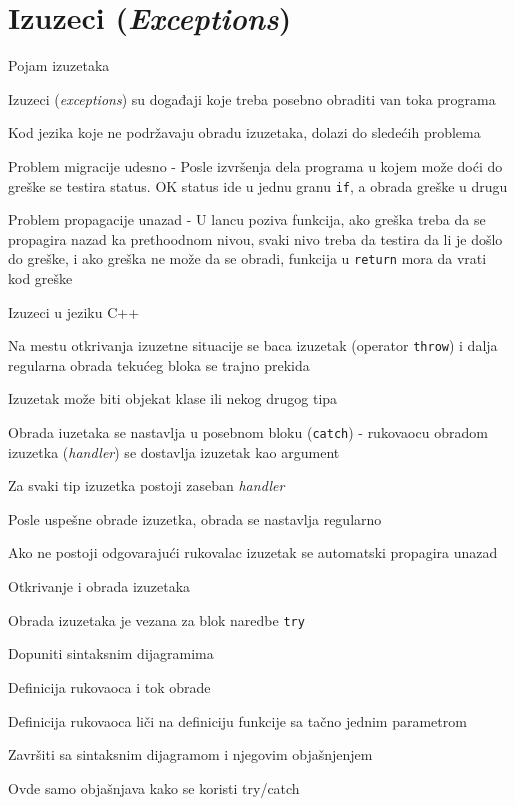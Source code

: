 \documentclass{article}
\newenvironment{xitemize}{%
    
    \itemize
    \larger
}{%
    \enditemize
}
\let\olditemize\itemize
\let\endolditemize\enditemize
\renewenvironment{itemize}{%
    \smaller
    \olditemize
}{%
    \endolditemize
}
\providecommand{\inlinecode}[1]{\texttt{#1}}
\begin{document}
\section{ Izuzeci (\textit{Exceptions})}
\begin{xitemize}
\item Pojam izuzetaka
\begin{itemize}
    \item Izuzeci (\textit{exceptions}) su događaji koje treba posebno obraditi van toka programa
    \item Kod jezika koje ne podržavaju obradu izuzetaka, dolazi do sledećih problema
    \begin{itemize}
        \item[\textperiodcentered] Problem migracije udesno - Posle izvršenja dela programa u kojem može doći do greške se testira status. OK status ide u jednu granu \inlinecode{if}, a obrada greške u drugu
        \item[\textperiodcentered] Problem propagacije unazad - U lancu poziva funkcija, ako greška treba da se propagira nazad ka prethoodnom nivou, svaki nivo treba da testira da li je došlo do greške, i ako greška ne može da se obradi, funkcija u \inlinecode{return} mora da vrati kod greške
    \end{itemize}
\end{itemize}
\item Izuzeci u jeziku C++
\begin{itemize}
    \item Na mestu otkrivanja izuzetne situacije se baca izuzetak (operator \inlinecode{throw}) i dalja regularna obrada tekućeg bloka se trajno prekida
    \item Izuzetak može biti objekat klase ili nekog drugog tipa
    \item Obrada iuzetaka se nastavlja u posebnom bloku (\inlinecode{catch}) - rukovaocu obradom izuzetka (\textit{handler}) se dostavlja izuzetak kao argument
    \item Za svaki tip izuzetka postoji zaseban \textit{handler}
    \item Posle uspešne obrade izuzetka, obrada se nastavlja regularno
    \item Ako ne postoji odgovarajući rukovalac izuzetak se automatski propagira unazad
\end{itemize}
\item Otkrivanje i obrada izuzetaka
\begin{itemize}
    \item Obrada izuzetaka je vezana za blok naredbe \inlinecode{try}
    \item Dopuniti sintaksnim dijagramima
\end{itemize}
\item Definicija rukovaoca i tok obrade
% 
\begin{itemize}
    \item Definicija rukovaoca liči na definiciju funkcije sa tačno jednim parametrom
    \item Završiti sa sintaksnim dijagramom i njegovim objašnjenjem
    \item Ovde samo objašnjava kako se koristi try/catch
    

\end{itemize}
\end{xitemize}
\end{document}
